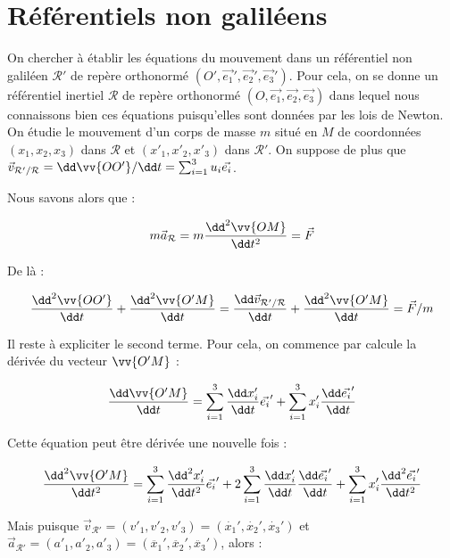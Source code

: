 \section{Référentiels non galiléens}

On chercher à établir les équations du mouvement dans un référentiel non galiléen $\mathcal{R}'$ de repère orthonormé $(O', \vec{e_1}', \vec{e_2}', \vec{e_3}')$. Pour cela, on se donne un référentiel inertiel $\mathcal{R}$ de repère orthonormé $(O, \vec{e_1}, \vec{e_2}, \vec{e_3})$ dans lequel nous connaissons bien ces équations puisqu'elles sont données par les lois de Newton. On étudie le mouvement d'un corps de masse $m$ situé en $M$ de coordonnées $(x_1, x_2, x_3)$ dans $\mathcal{R}$ et $(x'_1, x'_2, x'_3)$ dans $\mathcal{R}'$. On suppose de plus que $\vec{v}_{\mathcal{R'}/\mathcal{R}} =  \dd \vv{OO'} /\dd t = \sum_{i = 1}^{3} u_i \vec{e_i}$.

Nous savons alors que :

\begin{equation}
m \vec{a}_\mathcal{R}= m \dfrac{\dd^2 \vv{OM}}{\dd t^2} = \vec{F}
\end{equation}

De là :

\begin{equation}
\dfrac{\dd^2\vv{OO'}}{\dd  t} + \dfrac{\dd^2\vv{O'M}}{\dd  t} = \dfrac{\dd \vec{v}_{\mathcal{R'}/\mathcal{R}} }{\dd t} + \dfrac{\dd^2\vv{O'M}}{\dd  t} = \vec{F}/m
\end{equation}

Il reste à expliciter le second terme. Pour cela, on commence par calcule la dérivée du vecteur $\vv{O'M}$ :

\begin{equation}
\dfrac{\dd \vv{O'M}}{\dd t} = \sum_{i = 1}^{3} \dfrac{\dd x'_i}{\dd t} \vec{e_i}' + \sum_{i = 1}^{3} x'_i \dfrac{\dd \vec{e_i}'}{\dd t}
\end{equation}

Cette équation peut être dérivée une nouvelle fois :

\begin{equation}
\dfrac{\dd^2 \vv{O'M}}{\dd t^2} = \sum_{i = 1}^{3} \dfrac{\dd^2 x'_i}{\dd t^2} \vec{e_i}' + 2 \sum_{i = 1}^{3} \dfrac{\dd x'_i}{\dd t}  \dfrac{\dd \vec{e_i}'}{\dd t} +  \sum_{i = 1}^{3} x'_i \dfrac{\dd^2 \vec{e_i}'}{\dd t^2}
\end{equation}

Mais puisque $\vec{v}_\mathcal{R'} = (v'_1, v'_2, v'_3) = (\dot{x_1}', \dot{x_2}', \dot{x_3}')$ et $\vec{a}_\mathcal{R'} = (a'_1, a'_2, a'_3) = (\ddot{x_1}', \ddot{x_2}', \ddot{x_3}')$, alors :

